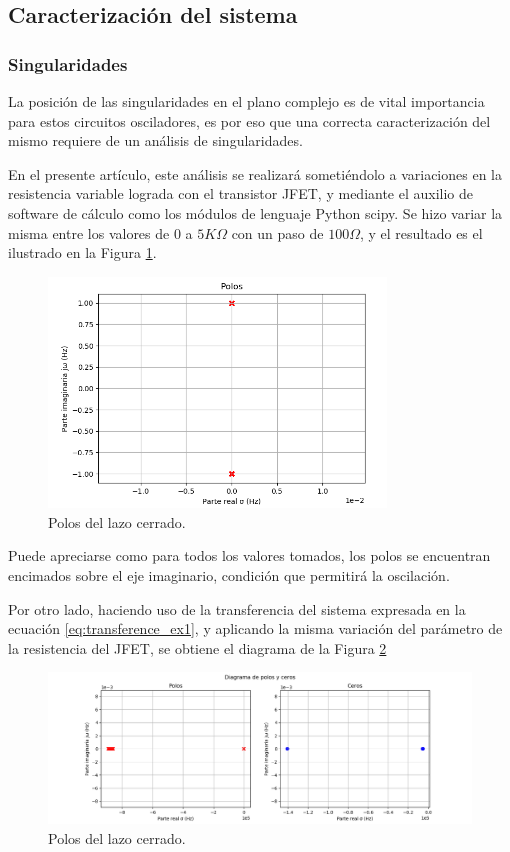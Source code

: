 \subsection{Caracterización del sistema}
\subsubsection{Singularidades}
La posición de las singularidades en el plano complejo es de vital importancia para estos circuitos osciladores, es por eso que una correcta caracterización 
del mismo requiere de un análisis de singularidades.

En el presente artículo, este análisis se realizará sometiéndolo a variaciones en la resistencia variable lograda con el transistor JFET, y mediante el 
auxilio de software de cálculo como los módulos de lenguaje Python scipy.
Se hizo variar la misma entre los valores de $0$ a $5K\Omega$ con un paso de $100\Omega$, y el resultado es el ilustrado en la Figura \ref{fig:closed_loop_poles_ex1}.
\begin{figure}[H]
    \centering
    \includegraphics[width=0.8\textwidth]{../EJ1/Recursos/closed_loop_poles.png}
    \caption{Polos del lazo cerrado.}
    \label{fig:closed_loop_poles_ex1}    
\end{figure}

Puede apreciarse como para todos los valores tomados, los polos se encuentran encimados sobre el eje imaginario, condición que permitirá la oscilación.

Por otro lado, haciendo uso de la transferencia del sistema expresada en la ecuación \ref{eq:transference_ex1}, y aplicando la misma variación del parámetro 
de la resistencia del JFET, se obtiene el diagrama de la Figura \ref{fig:transference_poles_and_zeros_ex1}
\begin{figure}[H]
    \centering
    \includegraphics[width=\textwidth]{../EJ1/Recursos/transference_poles_and_zeros.png}
    \caption{Polos del lazo cerrado.}
    \label{fig:transference_poles_and_zeros_ex1}    
\end{figure}


